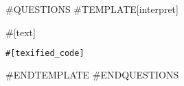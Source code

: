\documentclass[a4paper]{article}
\newenvironment{exercise}{
  \begin{framed}}{
  \end{framed}}
\begin{document}
#QUESTIONS
#TEMPLATE[interpret]
\begin{exercise}
\noindent #[text]
\begin{lstlisting}[language=JavaScript]
#[texified_code]
\end{lstlisting}
\end{exercise}
\clearpage
#ENDTEMPLATE
#ENDQUESTIONS
\end{document}
